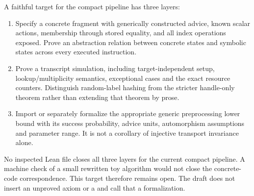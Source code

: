A faithful target for the compact pipeline has three layers:
\begin{enumerate}
\item Specify a concrete fragment with generically constructed advice,
known scalar actions, membership through stored equality, and all index
operations exposed. Prove an abstraction relation between concrete
states and symbolic states across every executed instruction.
\item Prove a transcript simulation, including target-independent setup,
lookup/multiplicity semantics, exceptional cases and the exact resource
counters. Distinguish random-label hashing from the stricter
handle-only theorem rather than extending that theorem by prose.
\item Import or separately formalize the appropriate generic
preprocessing lower bound with its success probability, advice units,
automorphism assumptions and parameter range. It is not a corollary of
injective transport invariance alone.
\end{enumerate}
No inspected Lean file closes all three layers for the current compact
pipeline. A machine check of a small rewritten toy algorithm would not
close the concrete-code correspondence. This target therefore remains
open. The draft does not insert an unproved axiom or a  and
call that a formalization.
